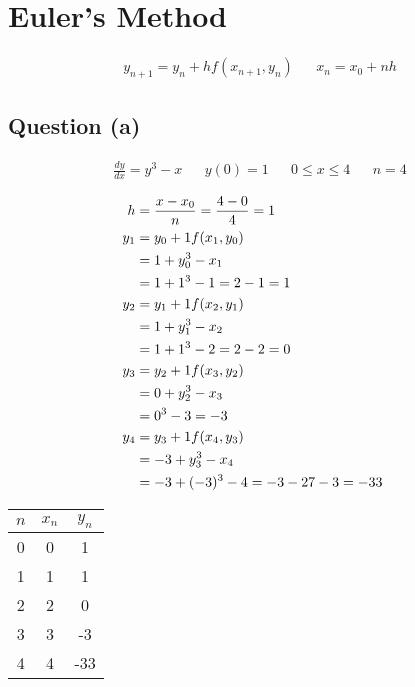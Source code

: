 \section{Euler's Method}
	\begin{align}
		&y_{n+1} = y_{n} + hf(x_{n+1}, y_{n})&
		&x_{n} = x_{0} + nh&
	\end{align}

	\subsection{Question (a)}
		\begin{align}
			&\frac{dy}{dx} = y^{3} - x&
			&y(0) = 1&
			&0 \leq x \leq 4&
			&n = 4&
		\end{align}

		\begin{align}
			h &= \frac{x - x_{0}}{n} = \frac{4 - 0}{4} = 1& \\
			y_{1} &= y_{0} + 1f(x_{1}, y_{0})& \\
			&= 1 + y_{0}^{3} - x_{1}& \notag \\
			&= 1 + 1^{3} - 1 = 2 - 1 = 1& \\
			y_{2} &= y_{1} + 1f(x_{2}, y_{1})& \\
			&= 1 + y_{1}^{3} - x_{2}& \notag \\
			&= 1 + 1^{3} - 2 = 2 - 2 = 0& \\
			y_{3} &= y_{2} + 1f(x_{3}, y_{2})& \\
			&= 0 + y_{2}^{3} - x_{3}& \notag \\
			&= 0^{3} - 3 = -3& \\
			y_{4} &= y_{3} + 1f(x_{4}, y_{3})& \\
			&= -3 + y_{3}^{3} - x_{4}& \notag \\
			&= -3 + (-3)^{3} - 4 = -3 -27 -3 = -33&
		\end{align}

		\begin{table}[H]
			\centering
			\begin{tabular}{|c|c|c|}
				\hline
				$n$ & $x_{n}$ & $y_{n}$ \\ \hline
				0 & 0 & 1 \\ \hline
				1 & 1 & 1 \\ \hline
				2 & 2 & 0 \\ \hline
				3 & 3 & -3 \\ \hline
				4 & 4 & -33 \\ \hline
			\end{tabular}
		\end{table}

